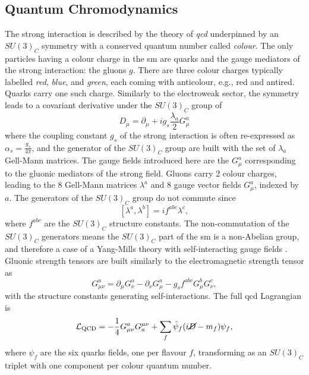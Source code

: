 \subsection{Quantum Chromodynamics}
The strong interaction is described by the theory of \textit{\gls{qcd}} underpinned by an $SU(3)_C$ symmetry with a conserved quantum number called \textit{colour}. The only particles having a colour charge in the \gls{sm} are quarks and the gauge mediators of the strong interaction: the gluons $g$. There are three colour charges typically labelled \textit{red}, \textit{blue}, and \textit{green}, each coming with anticolour, e.g., red and antired. Quarks carry one such charge. Similarly to the electroweak sector, the symmetry leads to a covariant derivative under the $SU(3)_C$ group of
\begin{equation}\label{eq-GaugeQCD}
    D_{\mu}  = \partial_{\mu} + ig_s \frac{\lambda_a}{2} G_{\mu}^a
\end{equation}
where the coupling constant $g_s$ of the strong interaction is often re-expressed as $\alpha_s = \frac{g_s}{4\pi}$, and the generator of the $SU(3)_C$ group are built with the set of $\lambda_a$ Gell-Mann matrices. The gauge fields introduced here are the $G_{\mu}^a$ corresponding to the gluonic mediators of the strong field. Gluons carry 2 colour charges, leading to the 8 Gell-Mann matrices $\lambda^a$ and 8 gauge vector fields $G_{\mu}^a$, indexed by $a$. The generators of the $SU(3)_C$ group do not commute since \[ [\lambda^a, \lambda^b] = i f^{abc} \lambda^c,\] where $f^{abc}$ are the $SU(3)_C$ structure constants. The non-commutation of the $SU(3)_C$ generators means the $SU(3)_C$ part of the \gls{sm} is a non-Abelian group, and therefore a case of a Yang-Mills theory with self-interacting gauge fields \cite{PhysRev.96.191}. Gluonic strength tensors are built similarly to the electromagnetic strength tensor as \[G_{\mu\nu}^a = \partial_{\mu} G_{\nu}^a   - \partial_{\nu} G_{\mu}^a - g_s f^{abc} G_{\mu}^b G_{\nu}^c,\] with the structure constants generating self-interactions. The full \gls{qcd} Lagrangian is
\begin{equation}\label{eq-QCDLag}
    \mathcal{L}_{\text{QCD}} = -\frac{1}{4} G_{\mu\nu}^a G^{\mu\nu}_a + \sum_{f} \bar{\psi}_f (i \cancel{D} - m_f) \psi_f,
\end{equation}
where $\psi_f$ are the six quarks fields, one per flavour $f$, transforming as an $SU(3)_C$ triplet with one component per colour quantum number. \\

